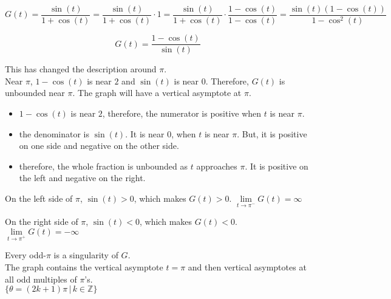\documentclass{ximera}
\begin{document}
\[   G(t) = \frac{\sin(t)}{1 + \cos(t)}  = \frac{\sin(t)}{1 + \cos(t)}  \cdot 1 = \frac{\sin(t)}{1 + \cos(t)}  \cdot \frac{1-\cos(t)}{1-\cos(t)} = \frac{\sin(t) (1-\cos(t))}{1-\cos^2(t)}    \]



\[    G(t) = \frac{1-\cos(t)}{\sin(t)}  \]



This has changed the description around $\pi$. \\

Near $\pi$, $1-\cos(t)$ is near $2$ and $\sin(t)$ is near $0$.  Therefore, $G(t)$ is unbounded near $\pi$.  The graph will have a vertical asymptote at $\pi$.


\begin{itemize}
\item $1-\cos(t)$ is near $2$, therefore, the numerator is positive when $t$ is near $\pi$.
\item the denominator is $\sin(t)$. It is near $0$, when $t$ is near $\pi$. But, it is positive on one side and negative on the other side.
\item therefore, the whole fraction is unbounded as $t$ approaches $\pi$.  It is positive on the left and negative on the right.
\end{itemize}




On the left side of $\pi$, $\sin(t) > 0$, which makes $G(t) > 0$.   $\lim\limits_{t \to \pi^{-}}G(t) = \infty$ 

On the right side of $\pi$, $\sin(t) < 0$, which makes $G(t) < 0$.   $\lim\limits_{t \to \pi^{+}}G(t) = -\infty$ 








Every odd-$\pi$ is a singularity of $G$.\\


The graph contains the vertical asymptote $t=\pi$ and then vertical asymptotes at all odd multiples of $\pi$'s. \\




$\{  \theta = (2k+1) \pi \, | \, k \in \mathbb{Z}   \}$
\end{document}
